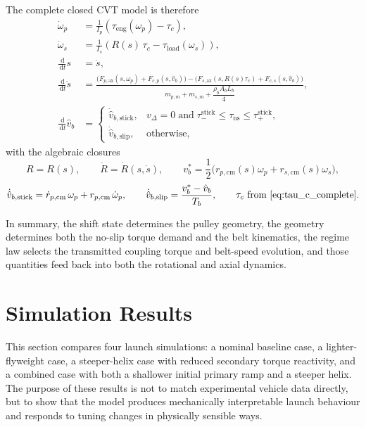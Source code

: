 \documentclass[11pt]{article}
\numberwithin{equation}{section}
\newcommand{\dd}{\,\mathrm{d}}
\begin{document}
The complete closed CVT model is therefore
\begin{equation}
\boxed{
\begin{aligned}
\dot\omega_p
&=
\frac{1}{I_p}
\left(
\tau_{\mathrm{eng}}(\omega_p) - \tau_c
\right),
\\[6pt]
\dot\omega_s
&=
\frac{1}{I_s}
\left(
R(s)\,\tau_c - \tau_{\mathrm{load}}(\omega_s)
\right),
\\[6pt]
\frac{\dd}{\dd t}s
&=
\dot s,
\\[6pt]
\frac{\dd}{\dd t}\dot s
&=
\frac{
\Big(F_{p,\mathrm{ax}}(s,\omega_p) + F_{c,p}(s,\hat v_b)\Big)
-
\Big(F_{s,\mathrm{ax}}(s,R(s)\tau_c) + F_{c,s}(s,\hat v_b)\Big)
}{
m_{p,m} + m_{s,m} + \dfrac{\rho_b A_b L_b}{4}
},
\\[6pt]
\frac{\dd}{\dd t}\hat v_b
&=
\begin{cases}
\dot{\hat v}_{b,\mathrm{stick}},
&
v_{\Delta}=0
\;\text{and}\;
\tau_-^{\mathrm{stick}} \le \tau_{\mathrm{ns}} \le \tau_+^{\mathrm{stick}},
\\[8pt]
\dot{\hat v}_{b,\mathrm{slip}},
&
\text{otherwise,}
\end{cases}
\end{aligned}
}
\label{eq:final_cvt_system_complete}
\end{equation}
with the algebraic closures
\[
R=R(s),
\qquad
\dot R=\dot R(s,\dot s),
\qquad
v_b^\ast=\frac{1}{2}\bigl(r_{p,\mathrm{cm}}(s)\omega_p+r_{s,\mathrm{cm}}(s)\omega_s\bigr),
\]
\[
\dot{\hat v}_{b,\mathrm{stick}}
=
\dot r_{p,\mathrm{cm}}\,\omega_p
+
r_{p,\mathrm{cm}}\,\dot\omega_p,
\qquad
\dot{\hat v}_{b,\mathrm{slip}}
=
\frac{v_b^\ast-\hat v_b}{T_b},
\qquad
\tau_c \text{ from \Eq{eq:tau_c_complete}}.
\]

In summary, the shift state determines the pulley geometry, the geometry
determines both the no-slip torque demand and the belt kinematics, the regime
law selects the transmitted coupling torque and belt-speed evolution, and those
quantities feed back into both the rotational and axial dynamics.

\section{Simulation Results}
\label{sec:results}

This section compares four launch simulations: a nominal baseline case, a
lighter-flyweight case, a steeper-helix case with reduced secondary torque
reactivity, and a combined case with both a shallower initial primary ramp and
a steeper helix. The purpose of these results is not to match experimental
vehicle data directly, but to show that the model produces mechanically
interpretable launch behaviour and responds to tuning changes in physically
sensible ways.
\end{document}
